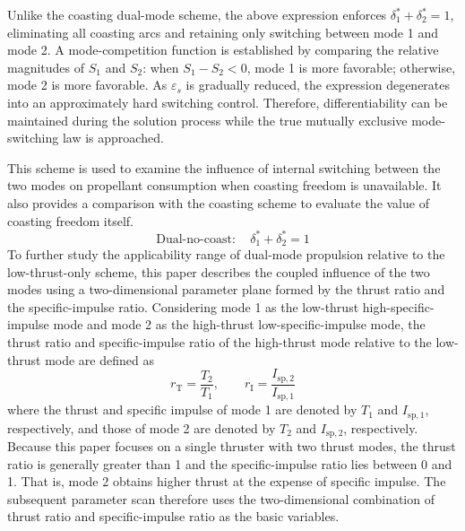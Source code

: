 ﻿\documentclass{IEEEtaes}
\begin{document}
Unlike the coasting dual-mode scheme, the above expression enforces $\delta_1^{*}+\delta_2^{*}=1$, eliminating all coasting arcs and retaining only switching between mode 1 and mode 2. A mode-competition function is established by comparing the relative magnitudes of $S_1$ and $S_2$: when $S_1-S_2<0$, mode 1 is more favorable; otherwise, mode 2 is more favorable. As $\varepsilon_s$ is gradually reduced, the expression degenerates into an approximately hard switching control. Therefore, differentiability can be maintained during the solution process while the true mutually exclusive mode-switching law is approached.

This scheme is used to examine the influence of internal switching between the two modes on propellant consumption when coasting freedom is unavailable. It also provides a comparison with the coasting scheme to evaluate the value of coasting freedom itself.
\begin{equation}
\text{Dual-no-coast}:\quad \delta_1^{*}+\delta_2^{*}=1
\end{equation}
To further study the applicability range of dual-mode propulsion relative to the low-thrust-only scheme, this paper describes the coupled influence of the two modes using a two-dimensional parameter plane formed by the thrust ratio and the specific-impulse ratio. Considering mode 1 as the low-thrust high-specific-impulse mode and mode 2 as the high-thrust low-specific-impulse mode, the thrust ratio and specific-impulse ratio of the high-thrust mode relative to the low-thrust mode are defined as
\begin{equation}
r_{\mathrm{T}}=\frac{T_2}{T_1},\qquad r_{\mathrm{I}}=\frac{I_{\mathrm{sp},2}}{I_{\mathrm{sp},1}}
\end{equation}
where the thrust and specific impulse of mode 1 are denoted by $T_1$ and $I_{\mathrm{sp},1}$, respectively, and those of mode 2 are denoted by $T_2$ and $I_{\mathrm{sp},2}$, respectively. Because this paper focuses on a single thruster with two thrust modes, the thrust ratio is generally greater than 1 and the specific-impulse ratio lies between 0 and 1. That is, mode 2 obtains higher thrust at the expense of specific impulse. The subsequent parameter scan therefore uses the two-dimensional combination of thrust ratio and specific-impulse ratio as the basic variables.
\end{document}

